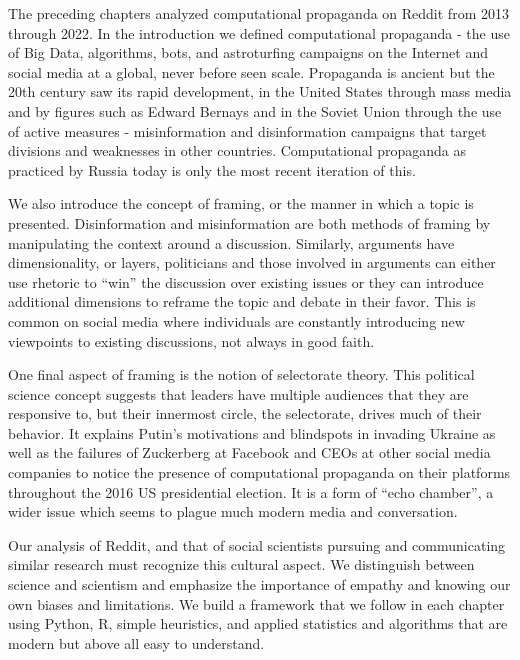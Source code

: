 \documentclass[doublespacing]{utdthesis}
\begin{document}
The preceding chapters analyzed computational propaganda on Reddit from 2013 through 2022.
In the introduction we defined computational propaganda - the use of Big Data, algorithms, bots, and astroturfing campaigns on the Internet and social media at a global, never before seen scale.
Propaganda is ancient but the 20th century saw its rapid development, in the United States through mass media and by figures such as Edward Bernays and in the Soviet Union through the use of active measures - misinformation and disinformation campaigns that target divisions and weaknesses in other countries.
Computational propaganda as practiced by Russia today is only the most recent iteration of this.

We also introduce the concept of framing, or the manner in which a topic is presented.
Disinformation and misinformation are both methods of framing by manipulating the context around a discussion.
Similarly, arguments have dimensionality, or layers, politicians and those involved in arguments can either use rhetoric to ``win'' the discussion over existing issues or they can introduce additional dimensions to reframe the topic and debate in their favor.
This is common on social media where individuals are constantly introducing new viewpoints to existing discussions, not always in good faith.

One final aspect of framing is the notion of selectorate theory.
This political science concept suggests that leaders have multiple audiences that they are responsive to, but their innermost circle, the selectorate,  drives much of their behavior.
It explains Putin's motivations and blindspots in invading Ukraine as well as the failures of Zuckerberg at Facebook and CEOs at other social media companies to notice the presence of computational propaganda on their platforms throughout the 2016 US presidential election.
It is a form of ``echo chamber'', a wider issue which seems to plague much modern media and conversation.

Our analysis of Reddit, and that of social scientists pursuing and communicating similar research must recognize this cultural aspect.
We distinguish between science and scientism and emphasize the importance of empathy and knowing our own biases and limitations.
We build a framework that we follow in each chapter using Python, R, simple heuristics, and applied statistics and algorithms that are modern but above all easy to understand.
\end{document}
